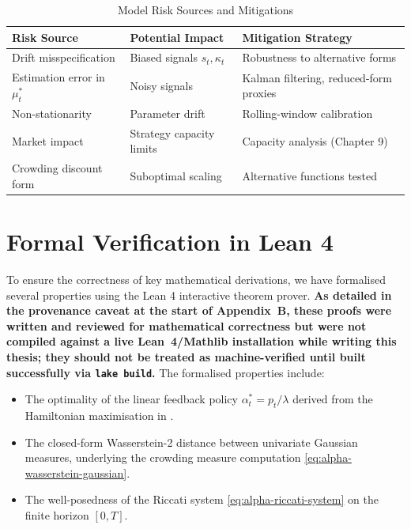 \begin{table}[ht]
\centering
\small
\caption{Model Risk Sources and Mitigations}
\label{tab:model-risk-sources}
\begin{tabular}{p{2.5cm}p{3cm}p{4.5cm}}
\toprule
\textbf{Risk Source} & \textbf{Potential Impact} & \textbf{Mitigation Strategy} \\
\midrule
Drift misspecification & Biased signals $s_t, \kappa_t$ & Robustness to alternative
    forms \\
Estimation error in $\mu_t^*$ & Noisy signals & Kalman filtering, reduced-form
    proxies \\
Non-stationarity & Parameter drift & Rolling-window calibration \\
Market impact & Strategy capacity limits & Capacity analysis (Chapter 9) \\
Crowding discount form & Suboptimal scaling & Alternative functions tested \\
\bottomrule
\end{tabular}
\end{table}


\section{Formal Verification in Lean 4}
\label{sec:alpha-lean4}

To ensure the correctness of key mathematical derivations, we have formalised
several properties using the Lean 4 interactive theorem prover. \textbf{As detailed
in the provenance caveat at the start of Appendix~B, these proofs were written and
reviewed for mathematical correctness but were not compiled against a live
Lean~4/Mathlib installation while writing this thesis; they should not be treated
as machine-verified until built successfully via \texttt{lake build}.} The
formalised properties
include:

\begin{itemize}
    \item The optimality of the linear feedback policy $\alpha_t^* = p_t/\lambda$
    derived from the Hamiltonian maximisation in .
    \item The closed-form Wasserstein-2 distance between univariate Gaussian
    measures, underlying the crowding measure computation
    \eqref{eq:alpha-wasserstein-gaussian}.
    \item The well-posedness of the Riccati system \eqref{eq:alpha-riccati-system}
    on the finite horizon $[0,T]$.
\end{itemize}

